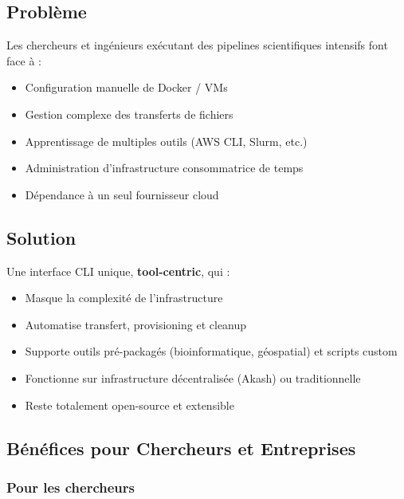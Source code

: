 \documentclass[11pt,a4paper]{article}
\newcommand{\highlight}[1]{\textbf{\color{darkblue}#1}}
\begin{document}
	\subsection{Problème}
	
	Les chercheurs et ingénieurs exécutant des pipelines scientifiques intensifs font face à :
	
	\begin{itemize}
		\item Configuration manuelle de Docker / VMs
		\item Gestion complexe des transferts de fichiers
		\item Apprentissage de multiples outils (AWS CLI, Slurm, etc.)
		\item Administration d'infrastructure consommatrice de temps
		\item Dépendance à un seul fournisseur cloud
	\end{itemize}
	
	\subsection{Solution}
	
	Une interface CLI unique, \highlight{tool-centric}, qui :
	
	\begin{itemize}
		\item Masque la complexité de l'infrastructure
		\item Automatise transfert, provisioning et cleanup
		\item Supporte outils pré-packagés (bioinformatique, géospatial) et scripts custom
		\item Fonctionne sur infrastructure décentralisée (Akash) ou traditionnelle
		\item Reste totalement open-source et extensible
	\end{itemize}
	
	\subsection{Bénéfices pour Chercheurs et Entreprises}
	
	\subsubsection{Pour les chercheurs}
	
\end{document}
